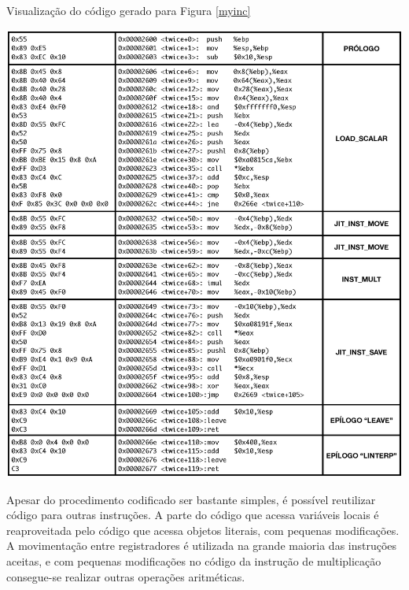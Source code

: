 \begin{table}[ht!]
  \centering
  \caption{Visualização do código gerado para Figura \ref{myinc} \label{codcompleto}}
  \includegraphics[scale=0.68]{figs/codelongo}
\end{table}



Apesar do procedimento codificado ser bastante simples, é possível
reutilizar código para outras instruções. %
 A parte do código que acessa
variáveis locais é reaproveitada pelo código que acessa objetos
literais, com pequenas modificações. A movimentação entre
registradores é utilizada na grande maioria das instruções aceitas, e
com pequenas modificações no código da instrução de multiplicação
consegue-se realizar outras operações aritméticas.


